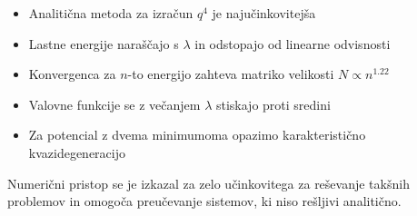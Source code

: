 \documentclass[12pt,a4paper]{article}
\begin{document}
\begin{itemize}
    \item Analitična metoda za izračun $q^4$ je najučinkovitejša
    \item Lastne energije naraščajo s $\lambda$ in odstopajo od linearne odvisnosti
    \item Konvergenca za $n$-to energijo zahteva matriko velikosti $N \propto n^{1.22}$
    \item Valovne funkcije se z večanjem $\lambda$ stiskajo proti sredini
    \item Za potencial z dvema minimumoma opazimo karakteristično kvazidegeneracijo
\end{itemize}

Numerični pristop se je izkazal za zelo učinkovitega za reševanje takšnih problemov in omogoča preučevanje sistemov, ki niso rešljivi analitično.
\end{document}
